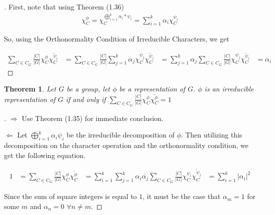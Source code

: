 \documentclass[10pt]{ucthesis}
\newtheorem{theorem}[definition]{Theorem}
\begin{document}
\noindent \begin{proof}[\cite{Tung}] First, note that using Theorem (1.36)
\begin{equation}
	\begin{aligned}
		\chi^\phi_C = \chi^{ \bigoplus_{i=1}^k \alpha_i *\psi_i}_C = \sum_{i=1}^k \alpha_i \chi^{\psi_i}_C
	\end{aligned}
\end{equation}

So, using the Orthonormality Condition of Irreducible Characters, we get 

\begin{equation}
	\begin{aligned}
\sum_{C\in C_G} \frac{|C|}{|G|}\chi^\phi_C \overline{\chi^{\psi_i}_C} &= \sum_{C\in C_G} \frac{|C|}{|G|} \sum_{j=1}^k \alpha_j \chi^{\psi_j}_C \overline{\chi^{\psi_i}_C} &= \sum_{j=1}^k \alpha_j \sum_{C\in C_G} \frac{|C|}{|G|} \chi^{\psi_j}_C \overline{\chi^{\psi_i}_C}  &= \alpha_i 
	\end{aligned}
\end{equation}
\end{proof}

\begin{theorem}
	Let $G$ be a group, let $\phi$ be a representation of $G$. $\phi$ is an irreducible representation of $G$ if and only if $\sum_{C\in C_G} \frac{|C|}{|G|}\chi^\phi_C \overline{\chi^\phi_C} = 1$
\end{theorem}

\noindent \begin{proof}[\cite{Tung}] $\Rightarrow$ Use Theorem (1.35) for immediate conclusion. 

\hspace{2mm}$\Leftarrow$ Let $\bigoplus_{i=1}^k \alpha_i\psi_i$ be the irreducible decomposition of $\phi$. Then utilizing this decomposition on the character operation and the orthonormality condition, we get the following equation.

\begin{equation}
	\begin{aligned}
		1 &=\sum_{C\in C_G} \frac{|C|}{|G|}\chi^\phi_C \overline{\chi^\phi_C} &= \sum_{i=1}^k \sum_{j=1}^k \alpha_i \overline{\alpha_j} \sum_{C\in C_G} \frac{|C|}{|G|} \chi^{\psi_i}_C \overline{\chi^{\psi_j}_C} &= \sum_{i=1}^k |\alpha_i|^2
	\end{aligned}
\end{equation}

Since the sum of square integers is equal to $1$, it must be the case that $\alpha_m = 1$ for some $m$ and $\alpha_n=0$  $\forall n \neq m$.  \end{proof}
\end{document}
